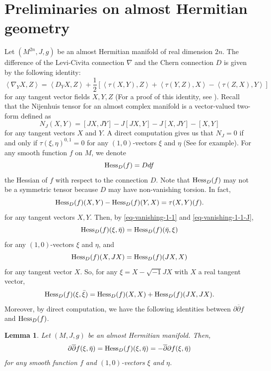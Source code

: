 \documentclass[12pt]{amsart}
\def\p{\partial}
\def\ii{{\sqrt{-1}}}
\def\dbar{\overline{\partial }}
\def\ddbar{\partial\overline\partial}
\def\vv<#1,#2>{\left\langle#1,#2\right\rangle}
\newtheorem{lem}{Lemma}[section]
\theoremstyle{definition}
\theoremstyle{remark}
\numberwithin{equation}{section}
\def\Hess{{\rm Hess}}
\begin{document}
\section{Preliminaries on almost Hermitian geometry}
Let $(M^{2n},J,g)$ be an almost Hermitian manifold of real dimension $2n$.
The difference of the Levi-Civita connection $\nabla$ and the Chern connection $D$ is given by the following identity:
\begin{equation}\label{eq-diff-connections}
\vv<\nabla_YX,Z>=\vv<D_Y X,Z>+\frac{1}{2}[\vv<\tau(X,Y),Z>+\vv<\tau(Y,Z),X>-\vv<\tau(Z,X),Y>]
\end{equation}
for any tangent vector fields $X,Y,Z$ (For a proof of this identity, see \cite{FTY}). Recall that the Nijenhuis tensor for an almost complex manifold is a vector-valued two-form defined as
\begin{equation}\label{eq-Nijenhuis}
N_J(X,Y)=[JX,JY]-J[JX,Y]-J[X,JY]-[X,Y]
\end{equation}
for any tangent vectors $X$ and $Y$. A direct computation gives us that $N_J=0$ if and only if $\tau(\xi,\eta)^{0,1}=0$ for any $(1,0)$-vectors $\xi$ and $\eta$ (See \cite{Yu1} for example). For any smooth function $f$ on $M$, we denote
\begin{equation}
\Hess_D(f)=Ddf
\end{equation}
the Hessian of $f$ with respect to the connection $D$. Note that $\Hess_D(f)$ may not be a symmetric tensor because $D$ may have non-vanishing torsion. In fact, 
\begin{equation}
\Hess_D(f)(X,Y)-\Hess_D(f)(Y,X)=\tau(X,Y)(f).
\end{equation}
for any tangent vectors $X,Y$. Then, by \eqref{eq-vanishing-1-1} and \eqref{eq-vanishing-1-1-J},
\begin{equation}\label{eq-Hess-D-commute}
\Hess_D(f)(\xi,\bar\eta)=\Hess_D(f)(\bar\eta,\xi)
\end{equation}
for any $(1,0)$-vectors $\xi$ and $\eta$, and
\begin{equation}
\Hess_D(f)(X,JX)=\Hess_D(f)(JX,X)
\end{equation}
for any tangent vector $X$. So, for any $\xi=X-\ii JX$ with  $X$ a real tangent vector,
\begin{equation}\label{eq-hess-f-J}
\Hess_D(f)(\xi,\bar\xi)=\Hess_D(f)(X,X)+\Hess_D(f)(JX,JX).
\end{equation}
 Moreover, by direct computation, we have the following identities between $\ddbar f$ and $\Hess_D(f)$.
\begin{lem}\label{lem-ddbar-f}
Let $(M,J,g)$ be an almost Hermitian manifold. Then,
\begin{equation}
\ddbar f(\xi,\bar\eta)=\Hess_D(f)(\xi,\bar \eta)=-\dbar\p f(\xi,\bar\eta)
\end{equation}
for any smooth function $f$ and $(1,0)$-vectors $\xi$ and $\eta$.
\end{lem}
\end{document}
